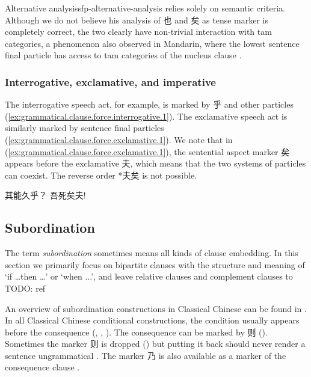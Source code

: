 \documentclass[UTF8, a4paper, oneside, scheme=plain, 12pt]{ctexrep}
\newcommand*{\citechap}[1]{Ch.~{#1}}
\newcommand*{\citepage}[1]{p.~{#1}}
\newcommand*{\citepages}[1]{pp.~{#1}}
\newcommand*{\term}[1]{\emph{#1}}
\newcommand{\translate}[1]{`#1'}
\begin{document}
\begin{infobox}{Alternative analysis}{sfp-alternative-analysis}
    \citet[\citepages{443-445}]{meiguang2018} relies solely on semantic criteria.
    Although we do not believe his analysis of 也 and 矣 as tense marker is completely correct,
    the two clearly have non-trivial interaction with \ac{tam} categories,
    a phenomenon also observed in Mandarin,
    where the lowest sentence final particle has access to \ac{tam} categories of the nucleus clause \citep[\citepage{258}]{paul2014new}.
\end{infobox}

\subsubsection{Interrogative, exclamative, and imperative}

The interrogative speech act, for example, is marked by 乎 and other particles
(\ref{ex:grammatical.clause.force.interrogative.1}).
The exclamative speech act is similarly marked by sentence final particles
(\ref{ex:grammatical.clause.force.exclamative.1}).
We note that in (\ref{ex:grammatical.clause.force.exclamative.1}),
the sentential aspect marker 矣 appears before the exclamative 夫,
which means that the two systems of particles can coexist.
The reverse order *夫矣 is not possible.

\begin{exe}
    \ex\label{ex:grammatical.clause.force.interrogative.1} 其能久乎？
    \ex\label{ex:grammatical.clause.force.exclamative.1} 吾死矣夫!
\end{exe}

\subsection{Subordination}\label{sec:grammatical.clause.linking}

The term \term{subordination} sometimes means all kinds of clause embedding.
In this section we primarily focus on bipartite clauses
with the structure and meaning of \translate{if \dots then \dots} or \translate{when ...},
and leave relative clauses and complement clauses to TODO: ref

An overview of subordination constructions in Classical Chinese can be found in \citet[\citechap{3}]{meiguang2018}.
In all Classical Chinese conditional constructions,
the condition usually appears before the consequence
(,
,
).
The consequence can be marked by 则
().
Sometimes the marker 则 is dropped
()
but putting it back should never render a sentence ungrammatical
\citep[\citepage{86}]{meiguang2018}.
The marker 乃 is also available as a marker of the consequence clause
\citep[\citepage{87}]{meiguang2018}.
\end{document}
